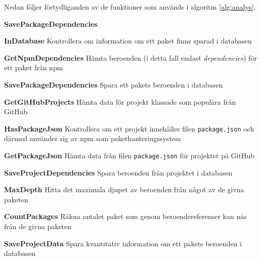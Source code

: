 Nedan följer förtydliganden av de funktioner som används i algoritm \ref{alg:analys}.

\begin{labeling}{\textbf{SavePackageDependencies}}
  \item [\textbf{InDatabase}] Kontrollera om information om ett paket finns sparad i databasen
  \item [\textbf{GetNpmDependencies}] Hämta beroenden (i detta fall endast \textit{dependencies}) för ett paket från npm
  \item [\textbf{SavePackageDependencies}] Spara ett pakets beroenden i databasen
  \item [\textbf{GetGitHubProjects}] Hämta data för projekt klassade som populära från GitHub
  \item [\textbf{HasPackageJson}] Kontrollera om ett projekt innehåller filen \texttt{package.json} och därmed använder sig av npm som pakethanteringssystem
  \item [\textbf{GetPackageJson}] Hämta data från filen \texttt{package.json} för projektet på GitHub
  \item [\textbf{SaveProjectDependencies}] Spara beroenden från projektet i databasen
  \item [\textbf{MaxDepth}] Hitta det maximala djupet av beroenden från något av de givna paketen
  \item [\textbf{CountPackages}] Räkna antalet paket som genom beroendereferenser kan nås från de givna paketen
  \item [\textbf{SaveProjectData}] Spara kvantitativ information om ett pakets beroenden i databasen
\end{labeling}

